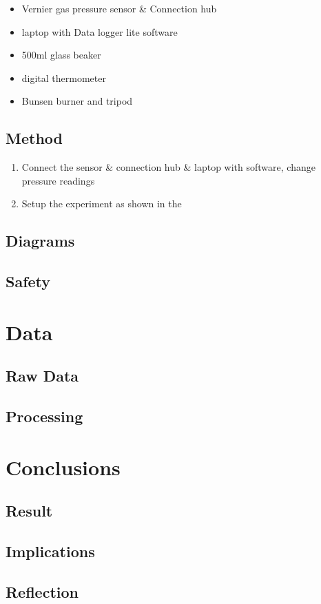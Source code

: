 \documentclass[a4paper,12pt]{article}
\begin{document}
\begin{itemize}
    \item Vernier gas pressure sensor \& Connection hub
    \item laptop with Data logger lite software
    \item 500ml glass beaker
    \item digital thermometer
    \item Bunsen burner and tripod
\end{itemize}

\subsection{Method}


\begin{enumerate}
    \item Connect the sensor \& connection hub \& laptop with software, change pressure readings
    \item Setup the experiment as shown in the

\end{enumerate}


\subsection{Diagrams}
\subsection{Safety}

\section{Data}
\subsection{Raw Data}
\subsection{Processing}

\section{Conclusions}
\subsection{Result}
\subsection{Implications}
\subsection{Reflection}
\end{document}

